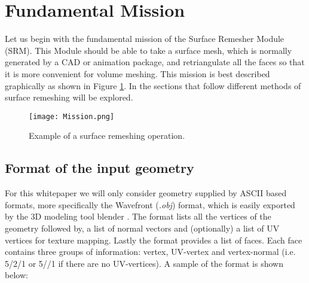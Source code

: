\documentclass[11pt,letterpaper,titlepage]{article}
\begin{document}
\pagestyle{fancy}
\cfoot{}
\lfoot{\truncate{14cm}{\NSCDOCTITLE}}
\rhead{}
\chead{\currentname}
\lhead{}
\renewcommand{\footrulewidth}{0.4pt}
\tableofcontents
{}

\listoffigures
\listoftables
{}


\newpage
{}
\section{Fundamental Mission}



Let us begin with the fundamental mission of the Surface Remesher Module (SRM). This Module should be able to take a surface mesh, which is normally generated by a CAD or animation package, and retriangulate all the faces so that it is more convenient for volume meshing. This mission is best described graphically as shown in Figure \ref{figure:Mission}. In the sections that follow different methods of surface remeshing will be explored.

\begin{center}
	\begin{minipage}[c]{0.82\textwidth}

		\begin{figure}[H]
		
			\texttt{[image: Mission.png]}
			\caption{Example of a surface remeshing operation.}
			\label{figure:Mission}
		\end{figure}
	\end{minipage}
\end{center}

\newpage
\subsection{Format of the input geometry}
For this whitepaper we will only consider geometry supplied by ASCII based formats, more specifically the Wavefront (\textit{.obj}) format, which is easily exported by the 3D modeling tool blender \cite{blender}. The format lists all the vertices of the geometry followed by, a list of normal vectors and (optionally) a list of UV vertices for texture mapping. Lastly the format provides a list of faces. Each face contains three groups of information: vertex, UV-vertex and vertex-normal (i.e. 5/2/1 or 5//1 if there are no UV-vertices). A sample of the format is shown below:
\end{document}

